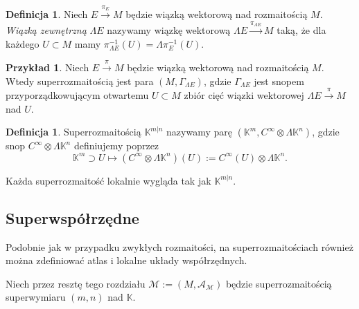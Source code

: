 \documentclass[11pt,a4paper]{report}
\theoremstyle{definition}
\newtheorem{example}[theorem]{Przykład}
\newtheorem{definition}[theorem]{Definicja}
\begin{document}
\begin{definition}
 Niech $E \stackrel{\pi_E}{\rightarrow} M$ będzie wiązką wektorową \cite{frankel} nad rozmaitością $M$. \textit{Wiązką zewnętrzną} $\Lambda E$ nazywamy wiązkę wektorową $\Lambda E \stackrel{\pi_{\Lambda E}}{\rightarrow} M$ taką, że dla każdego $U \subset M$ mamy $\pi_{\Lambda E}^{-1}(U) = \Lambda \pi_E ^{-1}(U)$.
\end{definition}

\begin{example}
Niech $E \stackrel{\pi}{\rightarrow} M$ będzie wiązką wektorową nad rozmaitością $M$. Wtedy superrozmaitością jest para $(M, \Gamma_{\Lambda E})$, gdzie $\Gamma_{\Lambda E}$ jest snopem przyporządkowującym otwartemu $U \subset M$ zbiór cięć wiązki wektorowej $\Lambda E \stackrel{\pi}{\rightarrow} M$ nad $U$.
\end{example}

\begin{definition}
Superrozmaitością $\mathbb{K}^{m|n}$ nazywamy parę $(\mathbb{K}^m, C^\infty \otimes \Lambda \mathbb{K}^n)$, gdzie snop $C^\infty \otimes \Lambda \mathbb{K}^n$ definiujemy poprzez
\begin{equation*}
\mathbb{K}^m \supset U \mapsto \left( C^\infty \otimes \Lambda \mathbb{K}^n \right) (U) := C^\infty (U) \otimes \Lambda \mathbb{K}^n.
\end{equation*}
\end{definition}

Każda superrozmaitość lokalnie wygląda tak jak $\mathbb{K}^{m|n}$.

\subsection{Superwspółrzędne}

Podobnie jak w przypadku zwykłych rozmaitości, na superrozmaitościach również można zdefiniować atlas i lokalne układy współrzędnych.

Niech przez resztę tego rozdziału $\mathcal{M} := (M,\mathcal{A}_\mathcal{M})$ będzie superrozmaitością superwymiaru $(m,n)$ nad $\mathbb{K}$.
\end{document}

